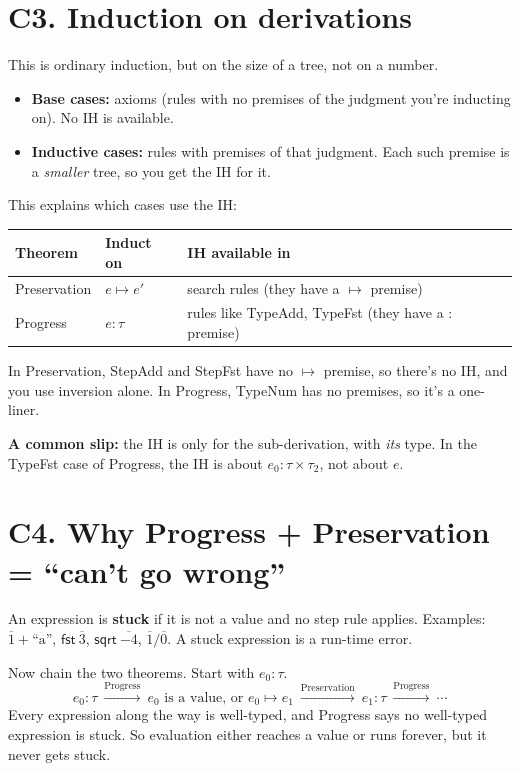 \documentclass[11pt]{article}
\newcommand{\stepto}[2]{#1 \mapsto #2}
\newcommand{\FST}[1]{\mathsf{fst}\ #1}
\newcommand{\SQRT}[1]{\mathsf{sqrt}\ #1}
\newcommand{\num}[1]{\overline{#1}}
\newcommand{\str}[1]{\text{``#1''}}
\begin{document}
\section*{C3. Induction on derivations}

This is ordinary induction, but on the size of a tree, not on a number.
\begin{itemize}
  \item \textbf{Base cases:} axioms (rules with no premises of the judgment
        you're inducting on). No IH is available.
  \item \textbf{Inductive cases:} rules with premises of that judgment. Each
        such premise is a \emph{smaller} tree, so you get the IH for it.
\end{itemize}
This explains which cases use the IH:
\begin{center}
\begin{tabular}{l l l}
  \textbf{Theorem} & \textbf{Induct on} & \textbf{IH available in} \\ \hline
  Preservation & $\stepto{e}{e'}$ & search rules (they have a $\mapsto$ premise) \\
  Progress     & $e:\tau$         & rules like TypeAdd, TypeFst (they have a $:$ premise) \\
\end{tabular}
\end{center}
In Preservation, StepAdd and StepFst have no $\mapsto$ premise, so there's no
IH, and you use inversion alone. In Progress, TypeNum has no premises, so
it's a one-liner.

\textbf{A common slip:} the IH is only for the sub-derivation, with
\emph{its} type. In the TypeFst case of Progress, the IH is about
$e_0:\tau\times\tau_2$, not about $e$.

\section*{C4. Why Progress + Preservation = ``can't go wrong''}

An expression is \textbf{stuck} if it is not a value and no step rule
applies. Examples: $\num1+\str{a}$, $\FST{\num3}$, $\SQRT{\num{-4}}$,
$\num1/\num0$. A stuck expression is a run-time error.

Now chain the two theorems. Start with $e_0:\tau$.
\[
  e_0:\tau
  \ \xrightarrow{\text{Progress}}\
  \text{$e_0$ is a value, or } e_0\mapsto e_1
  \ \xrightarrow{\text{Preservation}}\
  e_1:\tau
  \ \xrightarrow{\text{Progress}}\ \cdots
\]
Every expression along the way is well-typed, and Progress says no
well-typed expression is stuck. So evaluation either reaches a value or runs
forever, but it never gets stuck.
\end{document}
